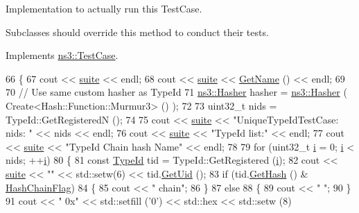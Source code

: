Implementation to actually run this Test\+Case. 

Subclasses should override this method to conduct their tests. 

Implements \hyperlink{classns3_1_1TestCase_a8ff74680cf017ed42011e4be51917a24}{ns3\+::\+Test\+Case}.


\begin{DoxyCode}
66 \{
67   cout << \hyperlink{type-id-test-suite_8cc_ab4acb0fe33ca0947f675eed6196ed8ca}{suite} << endl;
68   cout << \hyperlink{type-id-test-suite_8cc_ab4acb0fe33ca0947f675eed6196ed8ca}{suite} << \hyperlink{classns3_1_1TestCase_a28f7bb59669c24dae1c290fc17fc9b62}{GetName} () << endl;
69   
70   \textcolor{comment}{// Use same custom hasher as TypeId}
71   \hyperlink{classns3_1_1Hasher}{ns3::Hasher} hasher = \hyperlink{classns3_1_1Hasher}{ns3::Hasher} ( Create<Hash::Function::Murmur3> () );
72   
73   uint32\_t nids = TypeId::GetRegisteredN ();
74 
75   cout << \hyperlink{type-id-test-suite_8cc_ab4acb0fe33ca0947f675eed6196ed8ca}{suite} << \textcolor{stringliteral}{"UniqueTypeIdTestCase: nids: "} << nids << endl;
76   cout << \hyperlink{type-id-test-suite_8cc_ab4acb0fe33ca0947f675eed6196ed8ca}{suite} << \textcolor{stringliteral}{"TypeId list:"} << endl;
77   cout << \hyperlink{type-id-test-suite_8cc_ab4acb0fe33ca0947f675eed6196ed8ca}{suite} << \textcolor{stringliteral}{"TypeId  Chain  hash          Name"} << endl;
78   
79   \textcolor{keywordflow}{for} (uint32\_t \hyperlink{bernuolliDistribution_8m_a6f6ccfcf58b31cb6412107d9d5281426}{i} = 0; \hyperlink{bernuolliDistribution_8m_a6f6ccfcf58b31cb6412107d9d5281426}{i} < nids; ++\hyperlink{bernuolliDistribution_8m_a6f6ccfcf58b31cb6412107d9d5281426}{i})
80     \{
81       \textcolor{keyword}{const} \hyperlink{classns3_1_1TypeId}{TypeId} tid = TypeId::GetRegistered (\hyperlink{bernuolliDistribution_8m_a6f6ccfcf58b31cb6412107d9d5281426}{i});
82       cout << \hyperlink{type-id-test-suite_8cc_ab4acb0fe33ca0947f675eed6196ed8ca}{suite} << \textcolor{stringliteral}{""} << std::setw(6) << tid.\hyperlink{classns3_1_1TypeId_acd3e41de6340d06299f4fd63e2ed8da0}{GetUid} ();
83       \textcolor{keywordflow}{if} (tid.\hyperlink{classns3_1_1TypeId_a0ef137a352a374aa1ecaaace20a091d2}{GetHash} () & \hyperlink{classUniqueTypeIdTestCase_a66432bbd4685184c59237de907a1096ea81f1d39e319b1f8cce25024d66f099cd}{HashChainFlag})
84         \{
85           cout << \textcolor{stringliteral}{"  chain"};
86         \}
87       \textcolor{keywordflow}{else}
88         \{
89           cout << \textcolor{stringliteral}{"       "};
90         \}
91       cout << \textcolor{stringliteral}{"  0x"}     << std::setfill (\textcolor{charliteral}{'0'}) << std::hex << std::setw (8)

\end{DoxyCode}
